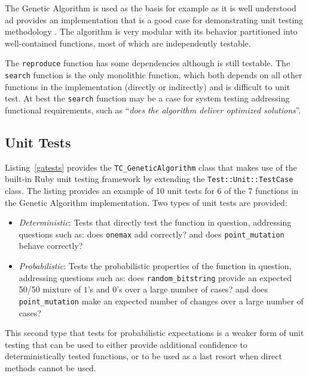 \documentclass[a4paper, 11pt]{article}
\begin{document}
The Genetic Algorithm is used as the basis for example as it is well understood ad provides an implementation that is a good case for demonstrating unit testing methodology \cite{Brownlee2010p}. The algorithm is very modular with its behavior partitioned into well-contained functions, most of which are independently testable. 

The \texttt{reproduce} function has some dependencies although is still testable. The \texttt{search} function is the only monolithic function, which both depends on all other functions in the implementation (directly or indirectly) and is difficult to unit test. At best the \texttt{search} function may be a case for system testing addressing functional requirements, such as ``\emph{does the algorithm deliver optimized solutions}''.



\subsection{Unit Tests}
\label{subsec:tests}
Listing~\ref{gatests} provides the \texttt{TC\_GeneticAlgorithm} class that makes use of the built-in Ruby unit testing framework by extending the \texttt{Test::Unit::TestCase} class.
The listing provides an example of 10 unit tests for 6 of the 7 functions in the Genetic Algorithm implementation. Two types of unit tests are provided: 

\begin{itemize}
	\item \emph{Deterministic}: Tests that directly test the function in question, addressing questions such as: does \texttt{onemax} add correctly? and does \texttt{point\_mutation} behave correctly?
	\item \emph{Probabilistic}: Tests the probabilistic properties of the function in question, addressing questions such as: does \texttt{random\_bitstring} provide an expected 50/50 mixture of $1$'s and $0$'s over a large number of cases? and does \texttt{point\_mutation} make an expected number of changes over a large number of cases?
\end{itemize}

This second type that tests for probabilistic expectations is a weaker form of unit testing that can be used to either provide additional confidence to deterministically tested functions, or to be used as a last resort when direct methods cannot be used.
\end{document}
